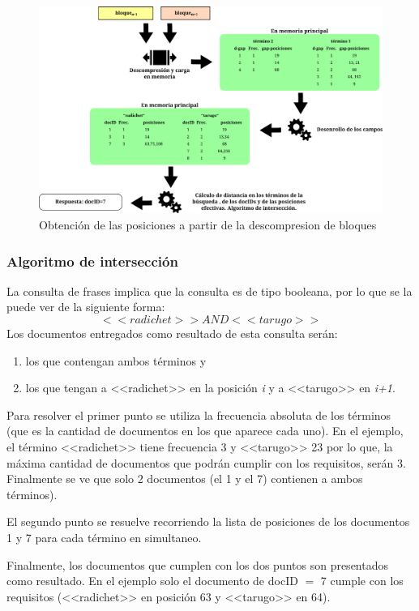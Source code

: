 \begin{figure}[!ht]
\centering
    \includegraphics[scale=0.8]{./Images/consulta2.png}
\caption{Obtención de las posiciones a partir de la descompresion de bloques}
\label{fig:consulta2}
\end{figure}


\subsubsection{Algoritmo de intersección}

La consulta de frases implica que la consulta es de tipo booleana, por lo que se la puede ver de la siguiente forma: 
\[ <<radichet>> AND <<tarugo>> \]
Los documentos entregados como resultado de esta consulta serán:
\begin{enumerate}
	\item los que contengan ambos términos y
	\item los que tengan a <<radichet>> en la posición \textit{i} y a <<tarugo>> en \textit{i+1}.
\end{enumerate}

Para resolver el primer punto se utiliza la frecuencia absoluta de los términos (que es la cantidad de documentos en los que aparece cada uno). En el ejemplo, el término <<radichet>> tiene frecuencia 3 y <<tarugo>> 23 por lo que, la máxima cantidad de documentos que podrán cumplir con los requisitos, serán 3. 
Finalmente se ve que solo 2 documentos (el 1 y el 7) contienen a ambos términos).

El segundo punto se resuelve recorriendo la lista de posiciones de los documentos 1 y 7 para cada término en simultaneo.

Finalmente, los documentos que cumplen con los dos puntos son presentados como resultado. En el ejemplo solo el documento de docID $=$ 7 cumple con los requisitos (<<radichet>> en posición 63 y <<tarugo>> en 64).




